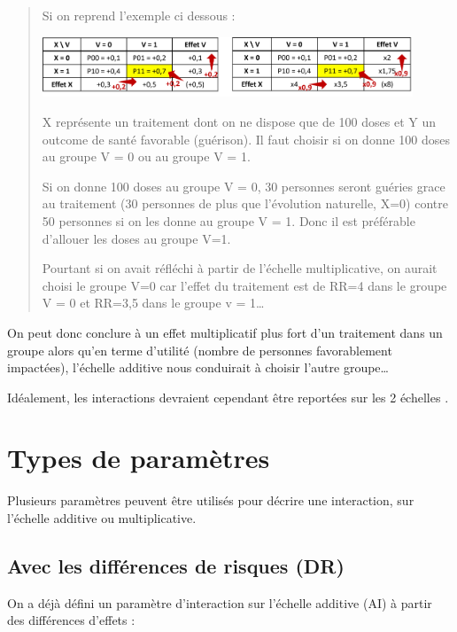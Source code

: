 \documentclass[
]{book}
\begin{document}
\begin{quote}
Si on reprend l'exemple ci dessous :

\includegraphics[width=0.9\textwidth,height=\textheight]{img/Image4.png}

X représente un traitement dont on ne dispose que de 100 doses et Y un outcome de santé favorable (guérison).
Il faut choisir si on donne 100 doses au groupe V = 0 ou au groupe V = 1.

Si on donne 100 doses au groupe V = 0, 30 personnes seront guéries grace au traitement (30 personnes de plus que l'évolution naturelle, X=0) contre 50 personnes si on les donne au groupe V = 1.
Donc il est préférable d'allouer les doses au groupe V=1.

Pourtant si on avait réfléchi à partir de l'échelle multiplicative, on aurait choisi le groupe V=0 car l'effet du traitement est de RR=4 dans le groupe V = 0 et RR=3,5 dans le groupe v = 1\ldots{}
\end{quote}

On peut donc conclure à un effet multiplicatif plus fort d'un traitement dans un groupe alors qu'en terme d'utilité (nombre de personnes favorablement impactées), l'échelle additive nous conduirait à choisir l'autre groupe\ldots{}

Idéalement, les interactions devraient cependant être reportées sur les 2 échelles \citet{knol_recommendations_2012} \citet{vanderweele_tutorial_2014}.

\hypertarget{types-de-paramuxe8tres}{%
\chapter{Types de paramètres}\label{types-de-paramuxe8tres}}

Plusieurs paramètres peuvent être utilisés pour décrire une interaction, sur l'échelle additive ou multiplicative.

\hypertarget{avec-les-diffuxe9rences-de-risques-dr}{%
\section{Avec les différences de risques (DR)}\label{avec-les-diffuxe9rences-de-risques-dr}}

On a déjà défini un paramètre d'interaction sur l'échelle additive (AI) à partir des différences d'effets \citet{vanderweele_tutorial_2014} :
\end{document}
